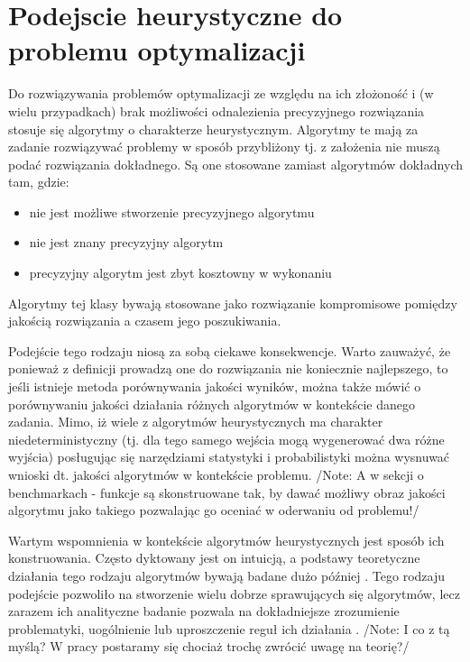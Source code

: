 \documentclass[12pt,a4paper]{report}
\begin{document}
{\section{Podejscie heurystyczne do problemu optymalizacji}
\par{
Do rozwiązywania problemów optymalizacji ze względu na ich złożoność i (w wielu przypadkach) brak możliwości odnalezienia precyzyjnego rozwiązania stosuje się algorytmy o charakterze heurystycznym. Algorytmy te mają za zadanie rozwiązywać problemy w sposób przybliżony tj. z założenia nie muszą podać rozwiązania dokładnego. Są one stosowane zamiast algorytmów dokładnych tam, gdzie: 
\begin{itemize}
\item nie jest możliwe stworzenie precyzyjnego algorytmu
\item nie jest znany precyzyjny algorytm
\item precyzyjny algorytm jest zbyt kosztowny w wykonaniu
\end{itemize}
}
\par{
Algorytmy tej klasy bywają stosowane jako rozwiązanie kompromisowe pomiędzy jakością rozwiązania a czasem jego poszukiwania.
}
\par{
Podejście tego rodzaju niosą za sobą ciekawe konsekwencje. Warto zauważyć, że ponieważ z definicji prowadzą one do rozwiązania nie koniecznie najlepszego, to jeśli istnieje metoda porównywania jakości wyników, można także mówić o porównywaniu jakości działania różnych algorytmów w kontekście danego zadania. Mimo, iż wiele z algorytmów heurystycznych ma charakter niedeterministyczny (tj. dla tego samego wejścia mogą wygenerować dwa różne wyjścia) posługując się narzędziami statystyki i probabilistyki można wysnuwać wnioski dt. jakości algorytmów w kontekście problemu. /Note: A w sekcji o benchmarkach - funkcje są skonstruowane tak, by dawać możliwy obraz jakości algorytmu jako takiego pozwalając go oceniać w oderwaniu od problemu!/
}
\par{
Wartym wspomnienia w kontekście algorytmów heurystycznych jest sposób ich konstruowania. Często dyktowany jest on intuicją, a podstawy teoretyczne działania tego rodzaju algorytmów bywają badane dużo później \cite{Opara}. Tego rodzaju podejście pozwoliło na stworzenie wielu dobrze sprawujących się algorytmów, lecz zarazem ich analityczne badanie pozwala na dokładniejsze zrozumienie problematyki, uogólnienie lub uproszczenie reguł ich działania \cite{Opara}. /Note: I co z tą myślą? W pracy postaramy się chociaż trochę zwrócić uwagę na teorię?/
}
\newpage
}
\end{document}
